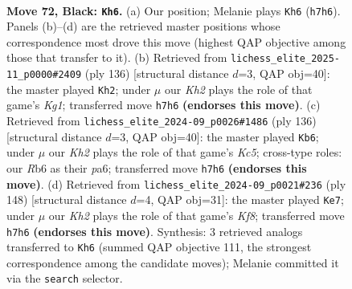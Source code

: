 \documentclass[11pt]{article}
\begin{document}
\clearpage

\begin{figure}[p]\centering
\begin{subfigure}{0.46\textwidth}\centering
\resizebox{\linewidth}{!}{%
\newchessgame
\chessboard[
  setfen={8/4R2k/1r6/8/5K2/8/7P/3r4 b - - 12 72},
  showmover=false,
  pgfstyle=straightmove, color=movearrow, markmove={h7-h6}
]}
\caption{}
\end{subfigure}\hfill
\begin{subfigure}{0.46\textwidth}\centering
\resizebox{\linewidth}{!}{%
\newchessgame
\chessboard[
  setfen={7R/8/8/5p2/8/5k2/8/1r4K1 w - - 2 69},
  showmover=false,
  pgfstyle=straightmove, color=movearrow, markmove={g1-h2}
]}
\caption{}
\end{subfigure}
\\[4pt]
\begin{subfigure}{0.46\textwidth}\centering
\resizebox{\linewidth}{!}{%
\newchessgame
\chessboard[
  setfen={1k6/6R1/p7/2K4r/8/8/8/8 w - - 13 69},
  showmover=false,
  pgfstyle=straightmove, color=movearrow, markmove={c5-b6}
]}
\caption{}
\end{subfigure}\hfill
\begin{subfigure}{0.46\textwidth}\centering
\resizebox{\linewidth}{!}{%
\newchessgame
\chessboard[
  setfen={5K2/8/8/3k3P/8/R7/8/5r2 w - - 39 75},
  showmover=false,
  pgfstyle=straightmove, color=movearrow, markmove={f8-e7}
]}
\caption{}
\end{subfigure}
\caption{\textbf{Move 72, Black: \texttt{Kh6}.} (a) Our position; Melanie plays \texttt{Kh6} (\texttt{h7h6}). Panels (b)--(d) are the retrieved master positions whose correspondence most drove this move (highest QAP objective among those that transfer to it). (b) Retrieved from \texttt{lichess\_elite\_2025-11\_p0000\#2409} (ply 136) [structural distance $d$=3, QAP obj=40]: the master played \texttt{Kh2}; under $\mu$ our \emph{Kh2} plays the role of that game's \emph{Kg1}; transferred move \texttt{h7h6} \textbf{(endorses this move)}. (c) Retrieved from \texttt{lichess\_elite\_2024-09\_p0026\#1486} (ply 136) [structural distance $d$=3, QAP obj=40]: the master played \texttt{Kb6}; under $\mu$ our \emph{Kh2} plays the role of that game's \emph{Kc5}; cross-type roles: our \emph{R}b6 as their \emph{p}a6; transferred move \texttt{h7h6} \textbf{(endorses this move)}. (d) Retrieved from \texttt{lichess\_elite\_2024-09\_p0021\#236} (ply 148) [structural distance $d$=4, QAP obj=31]: the master played \texttt{Ke7}; under $\mu$ our \emph{Kh2} plays the role of that game's \emph{Kf8}; transferred move \texttt{h7h6} \textbf{(endorses this move)}. Synthesis: 3 retrieved analogs transferred to \texttt{Kh6} (summed QAP objective 111, the strongest correspondence among the candidate moves); Melanie committed it via the \texttt{search} selector.}
\label{fig:thought-m143}
\end{figure}
\end{document}
